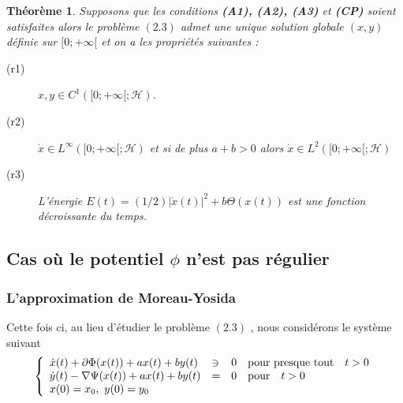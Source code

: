 \documentclass[a4paper,11pt]{book}
\theoremstyle{theo}
\newtheorem{theorem}{Théorème}[section]
\newcommand*{\Hi}{\mathcal{H}}
\begin{document}
\begin{theorem}
Supposons que les conditions \textbf{\upshape(A1), (A2), (A3)} et \textbf{\upshape(CP)} soient satisfaites alors le problème $(2.3)$ admet une unique solution globale $(x,y)$ définie sur $[0;+\infty[$ et on a les propriétés suivantes :
\begin{description}
\item[(r1)] $x,y\in C^1([0;+\infty[;\Hi)$.
\medskip
\item[(r2)] $\dot{x}\in L^{\infty}([0;+\infty[;\Hi)$ et si de plus $a+b>0$ alors $\dot{x}\in L^2([0;+\infty[;\Hi)$
\medskip
\item[(r3)] L'énergie $E(t) = (1/2)|\dot{x}(t)|^2+b\Theta(x(t))$ est une fonction décroissante du temps.
\end{description}
\end{theorem}


\subsection{Cas où le potentiel $\phi$ n'est pas régulier}

\subsubsection{L'approximation de Moreau-Yosida}
Cette fois ci, au lieu d'étudier le problème $(2.3)$ , nous considérons le système suivant
\begin{equation} \left\{
\begin{array}{l l l}
\dot{x}(t) + \partial\Phi(x(t)) + ax(t) + by(t) &\ni& 0 \quad \text{pour presque tout} \quad t>0\\
\dot{y}(t) - \nabla\Psi(x(t)) + ax(t) + by(t) &=& 0 \quad \text{pour} \quad t> 0 \\
x(0)=x_0, ~y(0)=y_0 
\end{array}
\right. 
\end{equation}
 
\end{document}
